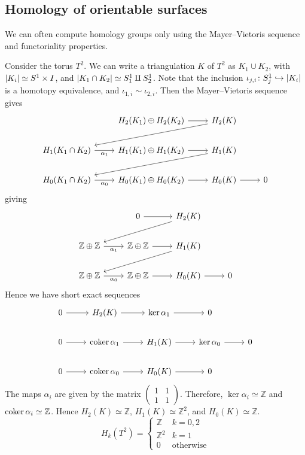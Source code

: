 \subsection{Homology of orientable surfaces}
We can often compute homology groups only using the Mayer--Vietoris sequence and functoriality properties.
\begin{example}
	Consider the torus \( T^2 \).
	We can write a triangulation \( K \) of \( T^2 \) as \( K_1 \cup K_2 \), with \( \abs{K_i} \simeq S^1 \times I \), and \( \abs{K_1 \cap K_2} \simeq S_1^1 \amalg S_2^1 \).
	Note that the inclusion \( \iota_{j,i} \colon S_j^1 \hookrightarrow \abs{K_i} \) is a homotopy equivalence, and \( \iota_{1,i} \sim \iota_{2,i} \).
	Then the Mayer--Vietoris sequence gives
	\[\begin{tikzcd}
		& {H_2(K_1)\oplus H_2(K_2)} & {H_2(K)} \\
		{H_1(K_1 \cap K_2)} & {H_1(K_1) \oplus H_1(K_2)} & {H_1(K)} \\
		{H_0(K_1 \cap K_2)} & {H_0(K_1) \oplus H_0(K_2)} & {H_0(K)} & 0
		\arrow[from=1-2, to=1-3]
		\arrow[from=1-3, to=2-1]
		\arrow["{\alpha_1}"', from=2-1, to=2-2]
		\arrow[from=2-2, to=2-3]
		\arrow[from=2-3, to=3-1]
		\arrow["{\alpha_0}"', from=3-1, to=3-2]
		\arrow[from=3-2, to=3-3]
		\arrow[from=3-3, to=3-4]
	\end{tikzcd}\]
	giving
	\[\begin{tikzcd}
		& 0 & {H_2(K)} \\
		{\mathbb Z \oplus \mathbb Z} & {\mathbb Z \oplus \mathbb Z} & {H_1(K)} \\
		{\mathbb Z \oplus \mathbb Z} & {\mathbb Z \oplus \mathbb Z} & {H_0(K)} & 0
		\arrow[from=1-2, to=1-3]
		\arrow[from=1-3, to=2-1]
		\arrow["{\alpha_1}"', from=2-1, to=2-2]
		\arrow[from=2-2, to=2-3]
		\arrow[from=2-3, to=3-1]
		\arrow["{\alpha_0}"', from=3-1, to=3-2]
		\arrow[from=3-2, to=3-3]
		\arrow[from=3-3, to=3-4]
	\end{tikzcd}\]
	Hence we have short exact sequences
	\[\begin{tikzcd}
		0 & {H_2(K)} & {\ker \alpha_1} & 0 \\
		0 & {\coker \alpha_1} & {H_1(K)} & {\ker \alpha_0} & 0 \\
		0 & {\coker \alpha_0} & {H_0(K)} & 0
		\arrow[from=1-1, to=1-2]
		\arrow[from=1-2, to=1-3]
		\arrow[from=1-3, to=1-4]
		\arrow[from=2-1, to=2-2]
		\arrow[from=2-2, to=2-3]
		\arrow[from=2-3, to=2-4]
		\arrow[from=2-4, to=2-5]
		\arrow[from=3-1, to=3-2]
		\arrow[from=3-2, to=3-3]
		\arrow[from=3-3, to=3-4]
	\end{tikzcd}\]
	The maps \( \alpha_i \) are given by the matrix \( \begin{pmatrix} 1 & 1 \\ 1 & 1 \end{pmatrix} \).
	Therefore, \( \ker \alpha_i \simeq \mathbb Z \) and \( \operatorname{coker} \alpha_i \simeq \mathbb Z \).
	Hence \( H_2(K) \simeq \mathbb Z \), \( H_1(K) \simeq \mathbb Z^2 \), and \( H_0(K) \simeq \mathbb Z \).
	\[ H_k(T^2) = \begin{cases}
		\mathbb Z & k = 0, 2 \\
		\mathbb Z^2 & k = 1 \\
		0 & \text{otherwise}
	\end{cases} \]
\end{example}
